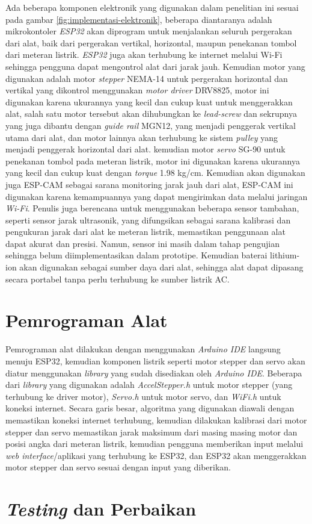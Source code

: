 Ada beberapa komponen elektronik yang digunakan dalam penelitian ini sesuai pada gambar \ref{fig:implementasi-elektronik},
beberapa diantaranya adalah
mikrokontoler \textit{ESP32} akan diprogram untuk menjalankan seluruh pergerakan dari alat, baik dari
pergerakan vertikal, horizontal, maupun penekanan tombol dari meteran listrik. \textit{ESP32} juga akan
terhubung ke internet melalui Wi-Fi sehingga pengguna dapat mengontrol alat dari jarak jauh. 
Kemudian motor yang digunakan
adalah motor \textit{stepper} NEMA-14 untuk pergerakan horizontal dan vertikal yang dikontrol menggunakan
\textit{motor driver} DRV8825, motor ini digunakan karena
ukurannya yang kecil dan cukup kuat untuk menggerakkan alat, salah satu motor tersebut akan dihubungkan
ke \textit{lead-screw} dan sekrupnya yang juga dibantu dengan \textit{guide rail} MGN12, 
yang menjadi penggerak vertikal utama dari alat, dan motor lainnya
akan terhubung ke sistem \textit{pulley} yang menjadi penggerak horizontal dari alat. kemudian motor 
\textit{servo} SG-90 untuk penekanan tombol pada meteran listrik, motor ini digunakan karena ukurannya 
yang kecil dan cukup kuat dengan \textit{torque} 1.98 kg/cm. 
Kemudian akan digunakan juga ESP-CAM sebagai sarana monitoring jarak jauh
dari alat, ESP-CAM ini digunakan karena kemampuannya yang dapat mengirimkan 
data melalui jaringan \textit{Wi-Fi}.
Penulis juga berencana untuk menggunakan beberapa sensor tambahan, seperti sensor jarak ultrasonik,
yang difungsikan sebagai sarana kalibrasi dan pengukuran jarak dari alat ke meteran listrik,
memastikan penggunaan alat dapat akurat dan presisi. Namun, sensor ini masih dalam tahap pengujian
sehingga belum diimplementasikan dalam prototipe. Kemudian baterai lithium-ion akan digunakan sebagai
sumber daya dari alat, sehingga alat dapat dipasang secara portabel tanpa perlu terhubung ke sumber listrik AC.

\section{Pemrograman Alat}

Pemrograman alat dilakukan dengan menggunakan \textit{Arduino IDE} langsung menuju ESP32, kemudian komponen listrik
seperti motor stepper dan servo akan diatur menggunakan \textit{library} yang sudah disediakan oleh \textit{Arduino IDE}.
Beberapa dari \textit{library} yang digunakan adalah \textit{AccelStepper.h} untuk motor stepper (yang terhubung ke driver motor), 
\textit{Servo.h} untuk motor servo, dan \textit{WiFi.h} untuk koneksi internet. Secara garis besar,
algoritma yang digunakan diawali dengan memastikan koneksi internet terhubung, kemudian dilakukan
kalibrasi dari motor stepper dan servo memastikan jarak maksimum dari masing masing motor dan posisi
angka dari meteran listrik, 
kemudian pengguna memberikan input melalui \textit{web interface}/aplikasi yang terhubung ke ESP32,
dan ESP32 akan menggerakkan motor stepper dan servo sesuai dengan input yang diberikan.

\section{\textit{Testing} dan Perbaikan}

\lipsum[11]